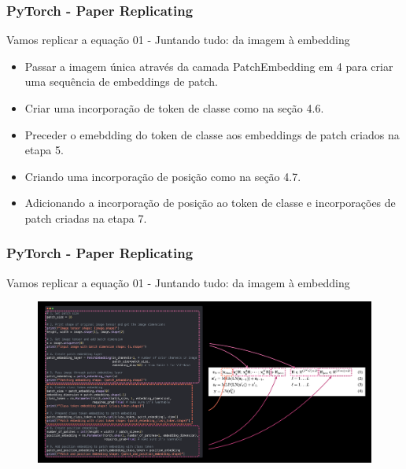 \documentclass{beamer}
\begin{document}
\begin{frame}
	\frametitle{PyTorch - Paper Replicating}
	\begin{block}{Vamos replicar a equação 01 - Juntando tudo: da imagem à embedding}
		\begin{itemize}
			\item Passar a imagem única através da camada PatchEmbedding em 4 para criar uma sequência de embeddings de patch.
			\item Criar uma incorporação de token de classe como na seção 4.6.
			\item Preceder o emebdding do token de classe aos embeddings de patch criados na etapa 5.
			\item Criando uma incorporação de posição como na seção 4.7.
			\item Adicionando a incorporação de posição ao token de classe e incorporações de patch criadas na etapa 7.
		\end{itemize}
		
	\end{block}
\end{frame}
\begin{frame}
	\frametitle{PyTorch - Paper Replicating}
	\begin{block}{Vamos replicar a equação 01 - Juntando tudo: da imagem à embedding}
		\begin{figure}
			\centering
			\includegraphics[width=1\linewidth]{figures/position_embedding_post1}
		\end{figure}
	\href{https://github.com/mafaldasalomao/pavic_treinamento_ml/raw/main/Machine_Learning/figures/08-vit-paper-architecture-animation-full-architecture.gif}{} 
	\end{block}
\end{frame}
\end{document}

